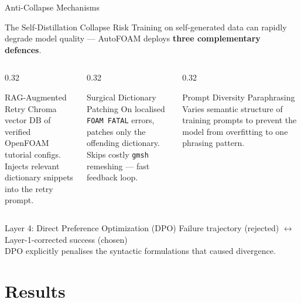 \documentclass[aspectratio=169,10pt]{beamer}
\begin{document}
\begin{frame}{Anti-Collapse Mechanisms}
  \begin{block}{The Self-Distillation Collapse Risk}
    Training on self-generated data can rapidly degrade model quality — AutoFOAM deploys \textbf{three complementary defences}.
  \end{block}
  \vspace{6pt}
  \begin{columns}
    \begin{column}{0.32\textwidth}
      \begin{exampleblock}{RAG-Augmented Retry}
        \small
        Chroma vector DB of verified OpenFOAM tutorial configs.\\[4pt]
        Injects relevant dictionary snippets into the retry prompt.
      \end{exampleblock}
    \end{column}
    \begin{column}{0.32\textwidth}
      \begin{exampleblock}{Surgical Dictionary Patching}
        \small
        On localised \texttt{FOAM FATAL} errors, patches only the offending dictionary.\\[4pt]
        Skips costly \texttt{gmsh} remeshing — fast feedback loop.
      \end{exampleblock}
    \end{column}
    \begin{column}{0.32\textwidth}
      \begin{exampleblock}{Prompt Diversity Paraphrasing}
        \small
        Varies semantic structure of training prompts to prevent the model from overfitting to one phrasing pattern.
      \end{exampleblock}
    \end{column}
  \end{columns}
  \vspace{8pt}
  \begin{alertblock}{Layer 4: Direct Preference Optimization (DPO)}
    \centering\small
    Failure trajectory (rejected) $\longleftrightarrow$ Layer-1-corrected success (chosen) \\
    DPO explicitly penalises the syntactic formulations that caused divergence.
  \end{alertblock}
\end{frame}

\section{Results}
\end{document}
